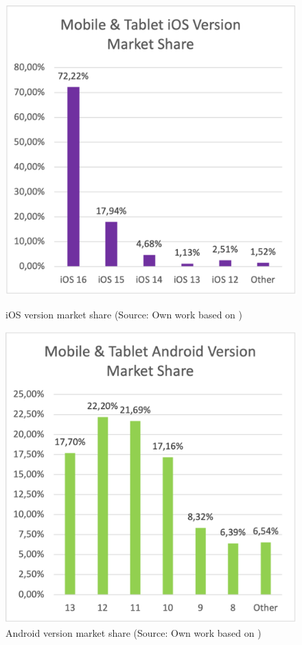 \begin{figure}[ht]
  \begin{minipage}{.47\textwidth}
    \includegraphics[width=\textwidth]{img/ios_ver_market_share}
    \caption{iOS version market share (Source: Own work based on \cite{statcounter_ios_version_market})}
    \label{fig:ios_versions}
  \end{minipage}
  \hfill
  \begin{minipage}{.47\textwidth}
    \includegraphics[width=\textwidth]{img/android_ver_market_share}
    \caption{Android version market share (Source: Own work based on \cite{statcounter_android_version_market})}
    \label{fig:android_versions}
  \end{minipage}
\end{figure}

